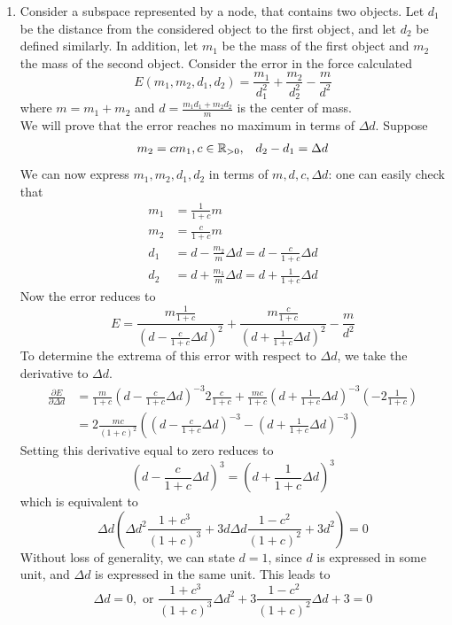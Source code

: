 \begin{enumerate}
\item\label{proofnomaximum} Consider a subspace represented by a node, that contains two objects. Let $d_1$ be the distance from the considered object to the first object, and let $d_2$ be defined similarly. In addition, let $m_1$ be the mass of the first object and $m_2$ the mass of the second object. Consider the error in the force calculated
\[
E(m_1,m_2,d_1,d_2) = \frac{m_1}{d_1^2}+\frac{m_2}{d_2^2}-\frac{m}{d^2}
\]
where $m = m_1+m_2$ and $d = \frac{m_1d_1+m_2d_2}{m}$ is the center of mass.\\
We will prove that the error reaches no maximum in terms of $\Delta d$. Suppose
\[
\begin{array}{cc}
m_2 = cm_1, c\in \mathbb{R}_{>0}, & d_2-d_1 = \Delta d
\end{array}
\]
We can now express $m_1,m_2,d_1,d_2$ in terms of $m,d,c,\Delta d$: one can easily check that
\begin{align*}
m_1 &= \frac{1}{1+c}m\\
m_2 &= \frac{c}{1+c}m\\
d_1 &= d-\frac{m_2}{m}\Delta d = d-\frac{c}{1+c}\Delta d\\
d_2 &= d+\frac{m_1}{m}\Delta d = d+\frac{1}{1+c}\Delta d
\end{align*}
Now the error reduces to
\[
E = \frac{m\frac{1}{1+c}}{(d-\frac{c}{1+c}\Delta d)^2}+\frac{m\frac{c}{1+c}}{(d+\frac{1}{1+c}\Delta d)^2}-\frac{m}{d^2}
\]
To determine the extrema of this error with respect to $\Delta d$, we take the derivative to $\Delta d$.
\begin{align*}
\frac{\partial E}{\partial \Delta d} &= \frac{m}{1+c}\left(d-\frac{c}{1+c}\Delta d\right)^{-3}2\frac{c}{1+c}+\frac{mc}{1+c}\left(d+\frac{1}{1+c}\Delta d\right)^{-3}\left(-2\frac{1}{1+c}\right)\\
&= 2\frac{mc}{(1+c)^2}\left(\left(d-\frac{c}{1+c}\Delta d\right)^{-3}-\left(d+\frac{1}{1+c}\Delta d\right)^{-3}\right)
\end{align*}
Setting this derivative equal to zero reduces to
\[
\left(d-\frac{c}{1+c}\Delta d\right)^3 = \left(d+\frac{1}{1+c}\Delta d\right)^3
\]
which is equivalent to
\[
\Delta d\left(\Delta d^2\frac{1+c^3}{(1+c)^3}+3d\Delta d\frac{1-c^2}{(1+c)^2}+3d^2\right) = 0
\]
Without loss of generality, we can state $d=1$, since $d$ is expressed in some unit, and $\Delta d$ is expressed in the same unit. This leads to
\begin{equation}
\Delta d = 0, \text{ or } \frac{1+c^3}{(1+c)^3}\Delta d^2+3\frac{1-c^2}{(1+c)^2}\Delta d+3 = 0
\end{equation}

\end{enumerate}
